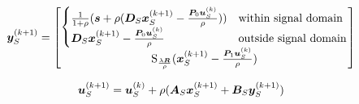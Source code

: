 \documentclass{article}
\begin{document}
\begin{equation}
\vy_S^{(k + 1)} = \begin{bmatrix}
\begin{cases}
\frac{1}{1 + \rho}(\vs + \rho(\mD_S\vx_S^{(k + 1)} - \frac{\mP_0\vu_S^{(k)}}{\rho})) & \text{within signal domain}\\
\mD_S\vx_S^{(k + 1)} - \frac{\mP_0\vu_S^{(k)}}{\rho} & \text{outside signal domain}
\end{cases} \\
\operatorname{S}_{\frac{\lambda\mR}{\rho}}(\vx_S^{(k+1)} - \frac{\mP_1\vu_S^{(k)}}{\rho})

\end{bmatrix}

\end{equation}


\begin{equation}
\bm{u}_S^{(k + 1)} = \bm{u}_S^{(k)} + \rho(\bm{A}_S\bm{x}_S^{(k + 1)} + \bm{B}_S\bm{y}_S^{(k + 1)})
\end{equation}
\end{document}
